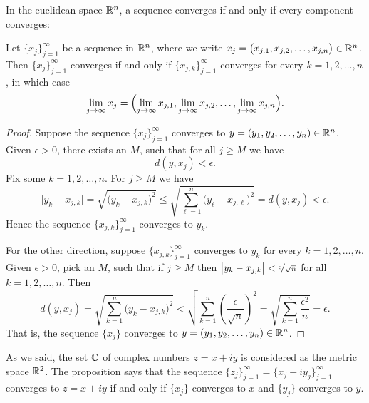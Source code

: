In the euclidean space ${\mathbb{R}}^n$, a sequence converges if and only if every
component converges:

\begin{prop} \label{prop:msconveuc}
Let $\{ x_j \}_{j=1}^\infty$ be a sequence in ${\mathbb{R}}^n$,
where we write $x_j = \bigl(x_{j,1},x_{j,2},\ldots,x_{j,n}\bigr) \in {\mathbb{R}}^n$.
Then $\{ x_j \}_{j=1}^\infty$ converges if and only if
$\{ x_{j,k} \}_{j=1}^\infty$ converges for every $k=1,2,\ldots,n$, in which case
\begin{equation*}
\lim_{j\to\infty}
x_j =
\Bigl(
\lim_{j\to\infty} x_{j,1},
\lim_{j\to\infty} x_{j,2},
\ldots,
\lim_{j\to\infty} x_{j,n}
\Bigr) .
\end{equation*}
\end{prop}

\begin{proof}
Suppose
the sequence
$\{ x_j \}_{j=1}^\infty$ converges to
$y = (y_1,y_2,\ldots,y_n) \in {\mathbb{R}}^n$.
Given $\epsilon > 0$, there exists an $M$, such that for all
$j \geq M$ we have
\begin{equation*}
d(y,x_j) < \epsilon.
\end{equation*}
Fix some $k=1,2,\ldots,n$.  For $j \geq M$ we have
\begin{equation*}
\bigl\lvert y_k - x_{j,k} \bigr\rvert
=
\sqrt{{\bigl(y_k - x_{j,k} \bigr)}^2}
\leq
\sqrt{\sum_{\ell=1}^n {\bigl(y_\ell-x_{j,\ell}\bigr)}^2}
= d(y,x_j) < \epsilon .
\end{equation*}
Hence the sequence $\{ x_{j,k} \}_{j=1}^\infty$ converges to $y_k$.

For the other direction, suppose 
$\{ x_{j,k} \}_{j=1}^\infty$ converges to $y_k$ for every $k=1,2,\ldots,n$.
Given $\epsilon > 0$, pick an $M$, such that if $j \geq M$ then 
$\bigl\lvert y_k-x_{j,k} \bigr\rvert < \nicefrac{\epsilon}{\sqrt{n}}$ for all
$k=1,2,\ldots,n$.  Then
\begin{equation*}
d(y,x_j)
=
\sqrt{\sum_{k=1}^n {\bigl(y_k-x_{j,k}\bigr)}^2}
<
\sqrt{\sum_{k=1}^n {\left(\frac{\epsilon}{\sqrt{n}}\right)}^2}
=
\sqrt{\sum_{k=1}^n \frac{{\epsilon^2}}{n}}
= \epsilon .
\end{equation*}
That is, the sequence $\{ x_j \}$ converges to
$y = (y_1,y_2,\ldots,y_n) \in {\mathbb{R}}^n$.
\end{proof}

\begin{example}
As we said, the set ${\mathbb{C}}$ of complex numbers $z = x+iy$ is considered 
as the metric space ${\mathbb{R}}^2$.  The proposition says that the
sequence $\{ z_j \}_{j=1}^\infty = \{ x_j + iy_j \}_{j=1}^\infty$ converges
to $z = x+iy$
if and only if $\{ x_j \}$ converges to $x$ and 
$\{ y_j \}$ converges to $y$.
\end{example}

